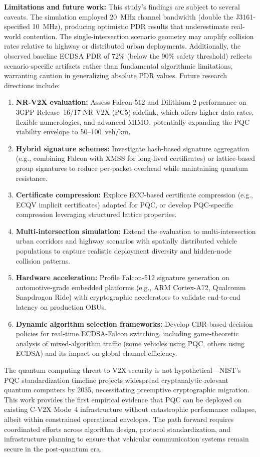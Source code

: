 \documentclass[letterpaper,journal]{IEEEtran}
\begin{document}
\textbf{Limitations and future work:} This study's findings are subject to several caveats. The simulation employed 20~MHz channel bandwidth (double the J3161-specified 10~MHz), producing optimistic PDR results that underestimate real-world contention. The single-intersection scenario geometry may amplify collision rates relative to highway or distributed urban deployments. Additionally, the observed baseline ECDSA PDR of 72\% (below the 90\% safety threshold) reflects scenario-specific artifacts rather than fundamental algorithmic limitations, warranting caution in generalizing absolute PDR values. Future research directions include:
\begin{enumerate}
    \item \textbf{NR-V2X evaluation:} Assess Falcon-512 and Dilithium-2 performance on 3GPP Release~16/17 NR-V2X (PC5) sidelink, which offers higher data rates, flexible numerologies, and advanced MIMO, potentially expanding the PQC viability envelope to 50--100~veh/km.
    \item \textbf{Hybrid signature schemes:} Investigate hash-based signature aggregation (e.g., combining Falcon with XMSS for long-lived certificates) or lattice-based group signatures to reduce per-packet overhead while maintaining quantum resistance.
    \item \textbf{Certificate compression:} Explore ECC-based certificate compression (e.g., ECQV implicit certificates) adapted for PQC, or develop PQC-specific compression leveraging structured lattice properties.
    \item \textbf{Multi-intersection simulation:} Extend the evaluation to multi-intersection urban corridors and highway scenarios with spatially distributed vehicle populations to capture realistic deployment diversity and hidden-node collision patterns.
    \item \textbf{Hardware acceleration:} Profile Falcon-512 signature generation on automotive-grade embedded platforms (e.g., ARM Cortex-A72, Qualcomm Snapdragon Ride) with cryptographic accelerators to validate end-to-end latency on production OBUs.
    \item \textbf{Dynamic algorithm selection frameworks:} Develop CBR-based decision policies for real-time ECDSA-Falcon switching, including game-theoretic analysis of mixed-algorithm traffic (some vehicles using PQC, others using ECDSA) and its impact on global channel efficiency.
\end{enumerate}

The quantum computing threat to V2X security is not hypothetical---NIST's PQC standardization timeline projects widespread cryptanalytic-relevant quantum computers by 2035, necessitating preemptive cryptographic migration. This work provides the first empirical evidence that PQC can be deployed on existing C-V2X Mode~4 infrastructure without catastrophic performance collapse, albeit within constrained operational envelopes. The path forward requires coordinated efforts across algorithm design, protocol standardization, and infrastructure planning to ensure that vehicular communication systems remain secure in the post-quantum era.
\end{document}
